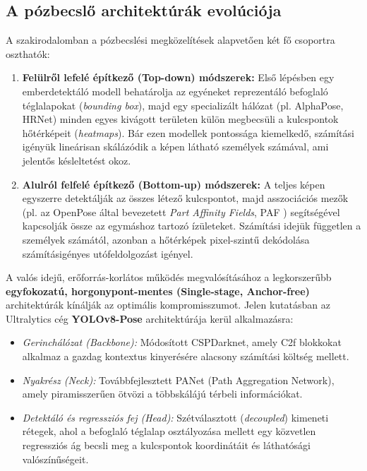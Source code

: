 \documentclass[12pt,a4paper,oneside]{report}
\begin{document}
\subsection{A pózbecslő architektúrák evolúciója}
A szakirodalomban a pózbecslési megközelítések alapvetően két fő csoportra oszthatók:
\begin{enumerate}
    \item \textbf{Felülről lefelé építkező (Top-down) módszerek:} Első lépésben egy emberdetektáló modell behatárolja az egyéneket reprezentáló befoglaló téglalapokat (\textit{bounding box}), majd egy specializált hálózat (pl. AlphaPose, HRNet) minden egyes kivágott területen külön megbecsüli a kulcspontok hőtérképeit (\textit{heatmaps}). Bár ezen modellek pontossága kiemelkedő, számítási igényük lineárisan skálázódik a képen látható személyek számával, ami jelentős késleltetést okoz.
    \item \textbf{Alulról felfelé építkező (Bottom-up) módszerek:} A teljes képen egyszerre detektálják az összes létező kulcspontot, majd asszociációs mezők (pl. az OpenPose által bevezetett \textit{Part Affinity Fields}, PAF \cite{cao2019openpose}) segítségével kapcsolják össze az egymáshoz tartozó ízületeket. Számítási idejük független a személyek számától, azonban a hőtérképek pixel-szintű dekódolása számításigényes utófeldolgozást igényel.
\end{enumerate}

A valós idejű, erőforrás-korlátos működés megvalósításához a legkorszerűbb \textbf{egyfokozatú, horgonypont-mentes (Single-stage, Anchor-free)} architektúrák kínálják az optimális kompromisszumot. Jelen kutatásban az Ultralytics cég \textbf{YOLOv8-Pose} \cite{yolov8pose} architektúrája kerül alkalmazásra:
\begin{itemize}
    \item \textit{Gerinchálózat (Backbone):} Módosított CSPDarknet, amely C2f blokkokat alkalmaz a gazdag kontextus kinyerésére alacsony számítási költség mellett.
    \item \textit{Nyakrész (Neck):} Továbbfejlesztett PANet (Path Aggregation Network), amely piramisszerűen ötvözi a többskálájú térbeli információkat.
    \item \textit{Detektáló és regressziós fej (Head):} Szétválasztott (\textit{decoupled}) kimeneti rétegek, ahol a befoglaló téglalap osztályozása mellett egy közvetlen regressziós ág becsli meg a kulcspontok koordinátáit és láthatósági valószínűségeit.
\end{itemize}
\end{document}

